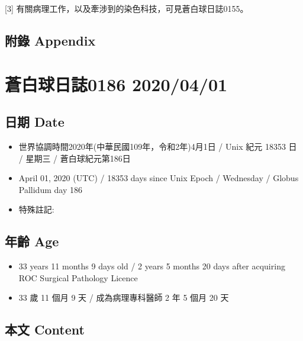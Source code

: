 \documentclass[a5paper, 11pt
]{book}
\providecommand{\tightlist}{%
  \setlength{\itemsep}{0pt}\setlength{\parskip}{0pt}}
\begin{document}
{[}3{]} 有關病理工作，以及牽涉到的染色科技，可見蒼白球日誌0155。

\hypertarget{ux9644ux9304-appendix-30}{%
\subsection{附錄 Appendix}\label{ux9644ux9304-appendix-30}}

\hypertarget{ux84bcux767dux7403ux65e5ux8a8c0186-20200401}{%
\section{蒼白球日誌0186
2020/04/01}\label{ux84bcux767dux7403ux65e5ux8a8c0186-20200401}}

\hypertarget{ux65e5ux671f-date-31}{%
\subsection{日期 Date}\label{ux65e5ux671f-date-31}}

\begin{itemize}
\tightlist
\item
  世界協調時間2020年(中華民國109年，令和2年)4月1日 / Unix 紀元 18353 日
  / 星期三 / 蒼白球紀元第186日
\item
  April 01, 2020 (UTC) / 18353 days since Unix Epoch / Wednesday /
  Globus Pallidum day 186
\item
  特殊註記:
\end{itemize}

\hypertarget{ux5e74ux9f61-age-31}{%
\subsection{年齡 Age}\label{ux5e74ux9f61-age-31}}

\begin{itemize}
\tightlist
\item
  33 years 11 months 9 days old / 2 years 5 months 20 days after
  acquiring ROC Surgical Pathology Licence
\item
  33 歲 11 個月 9 天 / 成為病理專科醫師 2 年 5 個月 20 天
\end{itemize}

\hypertarget{ux672cux6587-content-31}{%
\subsection{本文 Content}\label{ux672cux6587-content-31}}
\end{document}

